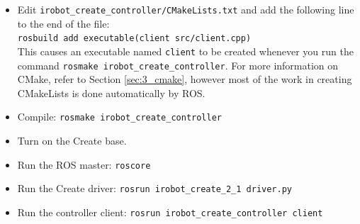 \begin{itemize}
\begin{verbatim}
      // Create and publish a Twist message
      geometry_msgs::Twist twist;
      twist.linear.x = forward; twist.linear.y = 0; twist.linear.z = 0;
      twist.angular.x = 0; twist.angular.y = 0; twist.angular.z = rotate;
      create_pub.publish(twist);

      ros::spinOnce();
    }

  // Stop the robot's movement
  geometry_msgs::Twist twist;
  twist.linear.x = 0; twist.linear.y = 0; twist.linear.z = 0;
  twist.angular.x = 0; twist.angular.y = 0; twist.angular.z = 0;
  create_pub.publish(twist);

  printf("Done.\n");
	
  return(0);
}
\end{verbatim}

The Create driver publishes a single message type, \texttt{SensorPacket.msg}, which exports all of the robot's sensory information. The message file exists in:\\ ros-1.0.0/pkg/irobot\_create\_2\_1/msg/SensorPacket.msg\\ 
For online documentation, visit the Brown ROS Create Driver \href{http://code.google.com/p/brown-ros-pkg/wiki/irobot\_create\_2\_1}{site}.

Additionally, use this \href{http://www.ros.org/wiki/ROS/Tutorials/WritingPublisherSubscriber(c\%2B\%2B)}{ROS tutorial} as a helpful resource for writing simple Publish and Subscriber nodes in C++.

\item Edit \texttt{irobot\_create\_controller/CMakeLists.txt} and add the following line to the end of the file:\\
\texttt{rosbuild add executable(client src/client.cpp)}\\
This causes an executable named \texttt{client} to be created whenever you run the command \texttt{rosmake irobot\_create\_controller}. For more information on CMake, refer to Section \ref{sec:3_cmake}, however most of the work in creating CMakeLists is done automatically by ROS.

\item Compile: \texttt{rosmake irobot\_create\_controller}

\item Turn on the Create base.

\item Run the ROS master: \texttt{roscore}

\item Run the Create driver: \texttt{rosrun irobot\_create\_2\_1 driver.py}

\item Run the controller client: \texttt{rosrun irobot\_create\_controller client}

\end{itemize}

